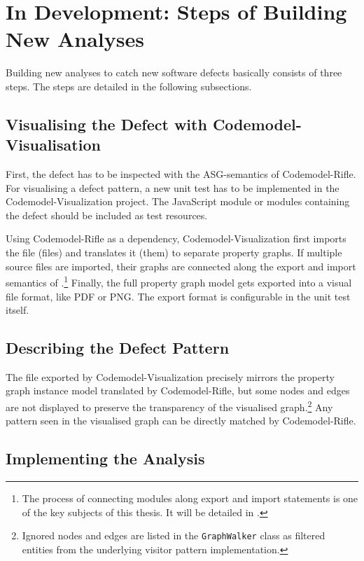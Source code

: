 \section{In Development: Steps of Building New Analyses}

Building new analyses to catch new software defects basically consists of three steps. The steps are detailed in the following subsections.


\subsection{Visualising the Defect with Codemodel-Visualisation}

First, the defect has to be inspected with the ASG-semantics of Codemodel-Rifle. For visualising a defect pattern, a new unit test has to be implemented in the Codemodel-Visualization project. The JavaScript module or modules containing the defect should be included as test resources.

Using Codemodel-Rifle as a dependency, Codemodel-Visualization first imports the file (files) and translates it (them) to separate property graphs. If multiple source files are imported, their graphs are connected along the export and import semantics of \es.\footnote{The process of connecting \es modules along export and import statements is one of the key subjects of this thesis. It will be detailed in .} Finally, the full property graph model gets exported into a visual file format, like PDF or PNG. The export format is configurable in the unit test itself.


\subsection{Describing the Defect Pattern}

The file exported by Codemodel-Visualization precisely mirrors the property graph instance model translated by Codemodel-Rifle, but some nodes and edges are not displayed to preserve the transparency of the visualised graph.\footnote{Ignored nodes and edges are listed in the \texttt{GraphWalker} class as filtered entities from the underlying visitor pattern implementation.} Any pattern seen in the visualised graph can be directly matched by Codemodel-Rifle.


\subsection{Implementing the Analysis}
\label{subsection:implementing-analyses}

